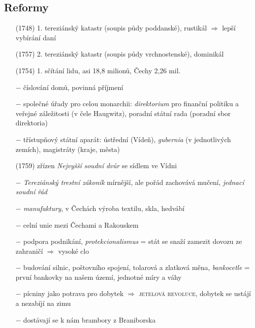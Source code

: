 \documentclass{article}
\begin{document}
\subsection*{Reformy}
\begin{itemize}
    \vspace{-0.5em}
    \setlength\itemsep{0.15em}
    \item[(1748)] 1. tereziánský katastr (soupis půdy poddanské), rustikál $\Rightarrow$ lepší vybírání daní
    \item[(1757)] 2. tereziánský katastr (soupis půdy vrchnostenské), dominikál
    \item[(1754)] 1. sčítání lidu, asi 18,8 milionů, Čechy 2,26 mil.
    \item[$-$] číslování domů, povinná příjmení
    \item[$-$] společné úřady pro celou monarchii: \textit{direktorium} pro finanční politiku a veřejné záležitosti (v čele Haugwitz), poradní státní rada (poradní sbor direktoria)
    \item[$-$] třístupňový státní aparát: ústřední (Vídeň), \textit{gubernia} (v jednotlivých zemích), magistráty (kraje, města)
    \item[(1759)] zřízen \textit{Nejvyšší soudní dvůr} se sídlem ve Vídni
    \item[$-$] \textit{Tereziánský trestní zákoník} mírnější, ale pořád zachovává mučení, \textit{jednací soudní řád}
    \item[$-$] \textit{manufaktury}, v Čechách výroba textilu, skla, hedvábí
    \item[$-$] celní unie mezi Čechami a Rakouskem
    \item[$-$] podpora podnikání, \textit{protekcionalismus} = stát se snaží zamezit dovozu ze zahraničí $\Rightarrow$ vysoké clo
    \item[$-$] budování silnic, poštovního spojení, tolarová a zlatková měna, \textit{bankocetle} = první bankovky na našem území, jednotné míry a váhy
    \item[$-$] pícniny jako potrava pro dobytek $\Rightarrow$ \textsc{jetelová revoluce}, dobytek se ustájí a nezabíjí na zimu
    \item[$-$] dostávají se k nám brambory z Braniborska  
\end{itemize}
\end{document}
